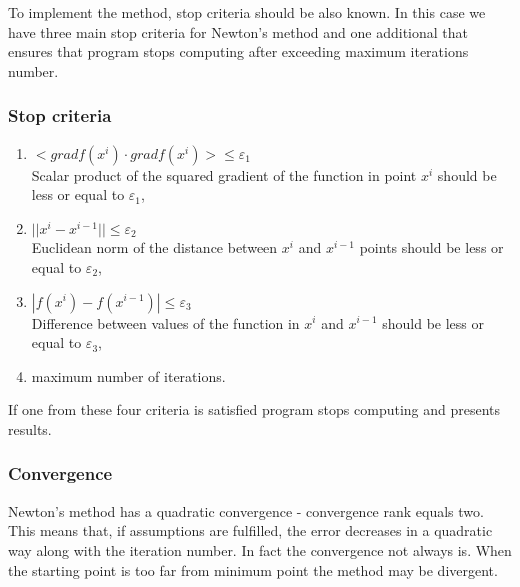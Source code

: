 \documentclass[12pt]{article}
\begin{document}
 To implement the method, stop criteria should be also known. In this case we have three main stop criteria for Newton's method and one additional that ensures that program stops computing after exceeding maximum iterations number.

\subsubsection{Stop criteria}
\begin{enumerate}
\item $ <grad f(x^i) \cdot grad f(x^i)> \leqslant \varepsilon_1 $ \\
Scalar product of the squared gradient of the function in point $x^i$ should be less or equal to $\varepsilon_1 $,
\item $ ||x^i-x^{i-1}|| \leqslant \varepsilon_2 $ \\
Euclidean norm of the distance between $x^i$ and $x^{i-1}$ points should be less or equal to $\varepsilon_2 $,
\item $ |f(x^i)-f(x^{i-1})| \leqslant \varepsilon_3 $ \\
Difference between values of the function in $x^i$ and $x^{i-1}$ should be less or equal to $\varepsilon_3 $,
\item maximum number of iterations.
\end{enumerate}  
If one from these four criteria is satisfied program stops computing and presents results. 

\subsubsection{Convergence}
Newton's method has a quadratic convergence - convergence rank equals two. This means that, if assumptions are fulfilled, the error decreases in a quadratic way along with the iteration number. In fact the convergence not always is. When the starting point is too far from minimum point the method may be divergent.
\end{document}
